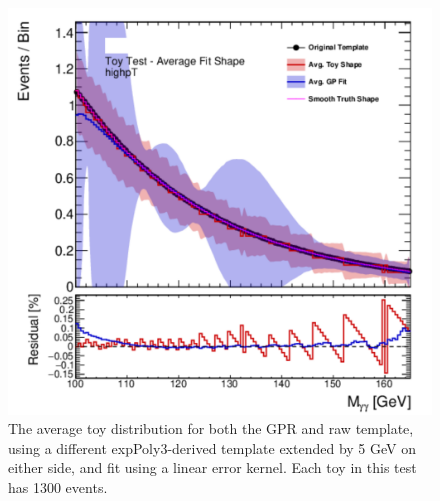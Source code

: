 \begin{figure} 
\begin{center}
  \includegraphics[width=\textwidth]{figures/background/gpr/validation/linear/ToyTest_AvgFitShape_highpT_1300_noSig}   
\caption{The average toy distribution for both the GPR and raw template, using a different expPoly3-derived template extended by 5 GeV on either side, and fit using a linear error kernel. Each toy in this test has 1300 events.}
\label{fig:linearkernel_highpt_1300_noSig}
\end{center}
\end{figure}


